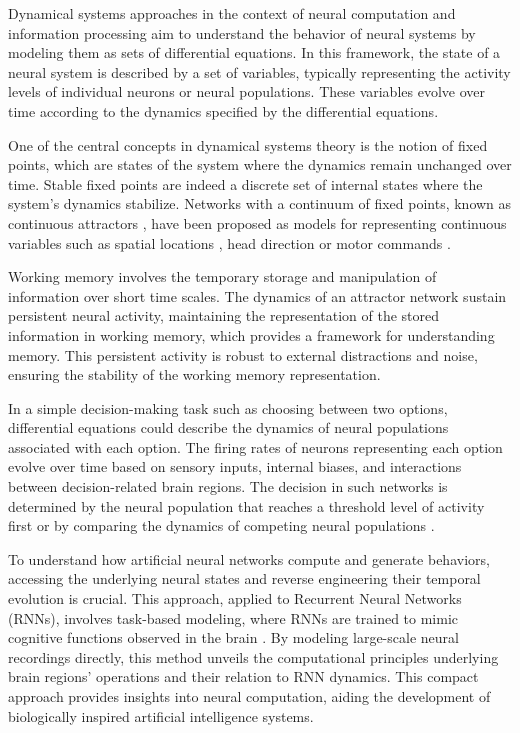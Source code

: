 \documentclass[12pt,letterpaper, onecolumn]{article}
\theoremstyle{definition}
\theoremstyle{remark}
\begin{document}
Dynamical systems approaches in the context of neural computation and information processing aim to understand the behavior of neural systems by modeling them as sets of differential equations. In this framework, the state of a neural system is described by a set of variables, typically representing the activity levels of individual neurons or neural populations. These variables evolve over time according to the dynamics specified by the differential equations. 

One of the central concepts in dynamical systems theory is the notion of fixed points, which are states of the system where the dynamics remain unchanged over time. Stable fixed points are indeed a discrete set of internal states where the system's dynamics stabilize. Networks with a continuum of fixed points, known as continuous attractors \citep{khona2022}, have been proposed as models for representing continuous variables such as spatial locations \citep{samsonovich1997, stringer2002placecells, yang2022}, head direction \citep{stringer2002headdirection, hulse2020, turner2017, turner2020neuroanatomical, vafidis2022, kim2019generation} or motor commands \citep{stringer2003}.

Working memory involves the temporary storage and manipulation of information over short time scales. The dynamics of an attractor network sustain persistent neural activity, maintaining the representation of the stored information in working memory, which provides a framework for understanding memory. This persistent activity is robust to external distractions and noise, ensuring the stability of the working memory representation.

In a simple decision-making task such as choosing between two options, differential equations could describe the dynamics of neural populations associated with each option. The firing rates of neurons representing each option evolve over time based on sensory inputs, internal biases, and interactions between decision-related brain regions. The decision in such networks is determined by the neural population that reaches a threshold level of activity first or by comparing the dynamics of competing neural populations \citep{wong2007, wong2008}.


To understand how artificial neural networks compute and generate behaviors, accessing the underlying neural states and reverse engineering their temporal evolution is crucial. This approach, applied to Recurrent Neural Networks (RNNs), involves task-based modeling, where RNNs are trained to mimic cognitive functions observed in the brain \citep{darshan2020, barak2017recurrent}. By modeling large-scale neural recordings directly, this method unveils the computational principles underlying brain regions' operations and their relation to RNN dynamics. This compact approach provides insights into neural computation, aiding the development of biologically inspired artificial intelligence systems.
\end{document}
